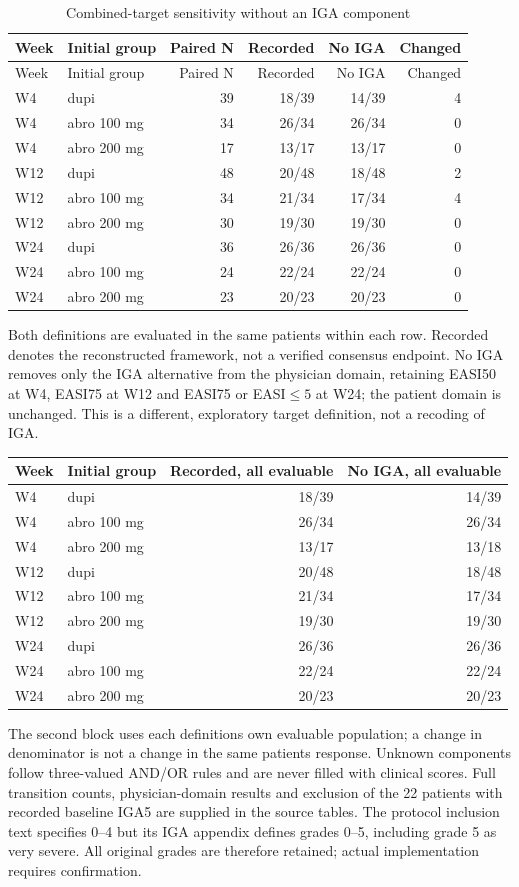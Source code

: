 {\small\setlength{\tabcolsep}{4pt}
\begin{longtable}{llrrrr}
\caption{Combined-target sensitivity without an IGA component}\label{tab:iga_definition}\\
\toprule Week & Initial group & Paired N & Recorded & No IGA & Changed \\ \midrule\endfirsthead
\toprule Week & Initial group & Paired N & Recorded & No IGA & Changed \\ \midrule\endhead
W4 & dupi & 39 & 18/39 & 14/39 & 4 \\
W4 & abro 100 mg & 34 & 26/34 & 26/34 & 0 \\
W4 & abro 200 mg & 17 & 13/17 & 13/17 & 0 \\
W12 & dupi & 48 & 20/48 & 18/48 & 2 \\
W12 & abro 100 mg & 34 & 21/34 & 17/34 & 4 \\
W12 & abro 200 mg & 30 & 19/30 & 19/30 & 0 \\
W24 & dupi & 36 & 26/36 & 26/36 & 0 \\
W24 & abro 100 mg & 24 & 22/24 & 22/24 & 0 \\
W24 & abro 200 mg & 23 & 20/23 & 20/23 & 0 \\
\bottomrule\end{longtable}
}
Both definitions are evaluated in the same patients within each row. Recorded denotes the reconstructed framework, not a verified consensus endpoint. No IGA removes only the IGA alternative from the physician domain, retaining EASI50 at W4, EASI75 at W12 and EASI75 or EASI$\leq5$ at W24; the patient domain is unchanged. This is a different, exploratory target definition, not a recoding of IGA.

{\small\begin{tabular}{llrr}\toprule Week & Initial group & Recorded, all evaluable & No IGA, all evaluable \\ \midrule
W4 & dupi & 18/39 & 14/39 \\
W4 & abro 100 mg & 26/34 & 26/34 \\
W4 & abro 200 mg & 13/17 & 13/18 \\
W12 & dupi & 20/48 & 18/48 \\
W12 & abro 100 mg & 21/34 & 17/34 \\
W12 & abro 200 mg & 19/30 & 19/30 \\
W24 & dupi & 26/36 & 26/36 \\
W24 & abro 100 mg & 22/24 & 22/24 \\
W24 & abro 200 mg & 20/23 & 20/23 \\
\bottomrule\end{tabular}}

The second block uses each definition\textquotesingle s own evaluable population; a change in denominator is not a change in the same patient\textquotesingle s response. Unknown components follow three-valued AND/OR rules and are never filled with clinical scores. Full transition counts, physician-domain results and exclusion of the 22 patients with recorded baseline IGA5 are supplied in the source tables. The protocol inclusion text specifies 0--4 but its IGA appendix defines grades 0--5, including grade 5 as very severe. All original grades are therefore retained; actual implementation requires confirmation.
